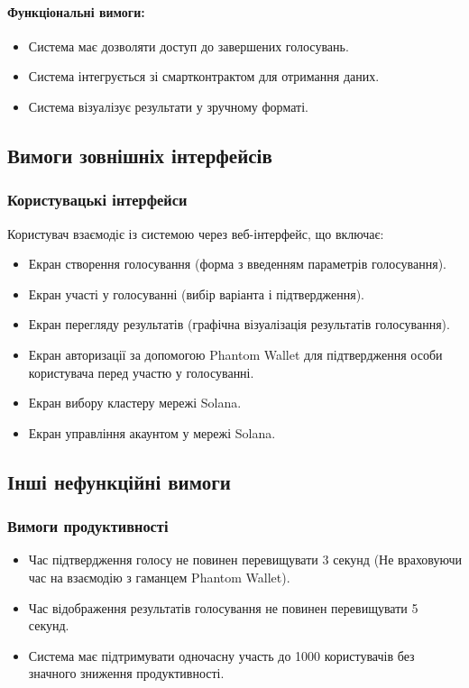 \documentclass[14pt]{extreport}
\newcounter{req}[subsubsection]
\newcommand\req{\arabic{req}\stepcounter{req}}
\begin{document}
  \paragraph{Функціональні вимоги:}  
  \begin{itemize}[leftmargin=*,label=REQ-.\req:]  
      \item Система має дозволяти доступ до завершених голосувань.  
      \item Система інтегрується зі смартконтрактом для отримання даних.  
      \item Система візуалізує результати у зручному форматі.
  \end{itemize}  

  \subsection{Вимоги зовнішніх інтерфейсів}
  \subsubsection{Користувацькі інтерфейси}
  Користувач взаємодіє із системою через веб-інтерфейс, що включає:
  \begin{itemize}
    \item Екран створення голосування (форма з введенням параметрів голосування).
    \item Екран участі у голосуванні (вибір варіанта і підтвердження).
    \item Екран перегляду результатів (графічна візуалізація результатів голосування).
    \item Екран авторизації за допомогою Phantom Wallet для підтвердження особи користувача перед участю у голосуванні.
    \item Екран вибору кластеру мережі Solana.
    \item Екран управління акаунтом у мережі Solana.
  \end{itemize}
  
  \subsection{Інші нефункційні вимоги}
  \subsubsection{Вимоги продуктивності}
  \begin{itemize}
    \item Час підтвердження голосу не повинен перевищувати 3 секунд (Не враховуючи час на взаємодію з гаманцем Phantom Wallet).
    \item Час відображення результатів голосування не повинен перевищувати 5 секунд.  
    \item Система має підтримувати одночасну участь до 1000 користувачів без значного зниження продуктивності.  
  \end{itemize}
\end{document}
